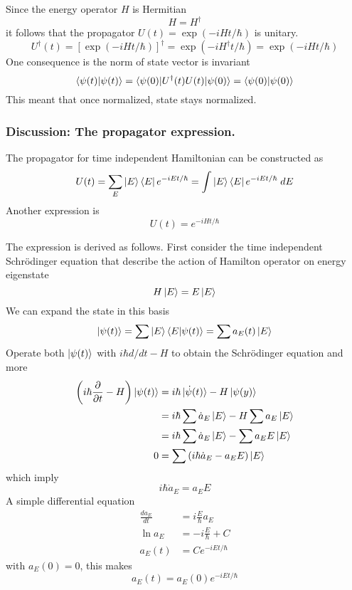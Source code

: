 \documentclass[../../../main.tex]{subfiles}
\begin{document}
Since the energy operator $H$ is Hermitian
\begin{equation*}
    H=H ^\dagger
\end{equation*}
it follows that the propagator $U(t)=\exp(-i Ht/\hbar)$ is unitary.
\begin{equation*}
    U ^\dagger(t)=\left[\exp(-i Ht/\hbar)\right]^\dagger=\exp(-i H ^\dagger t/\hbar)=\exp(-i Ht/\hbar)
\end{equation*} 
One consequence is the norm of state vector is invariant
\begin{equation*}
    \braket{\psi(t)|\psi(t)}=\braket{\psi(0)|U ^\dagger(t)U(t)|\psi(0)}=\braket{\psi(0)|\psi(0)}
\end{equation*}
This meant that once normalized, state stays normalized.

\subsubsection{Discussion: The propagator expression.}
The propagator for time independent Hamiltonian can be constructed as 
\begin{equation*}
    U(t)=\sum_E \ket{E } \bra{E }e^{-iEt/\hbar}=\int \ket{E} \bra{E}e^{-iEt/\hbar}\;dE
\end{equation*}
Another expression is 
\begin{equation*}
    U(t)=e^{-iHt/\hbar}
\end{equation*}

The expression is derived as follows.
First consider the time independent Schrödinger equation that describe the action of Hamilton operator on energy eigenstate
\begin{equation*}
    H \ket{E}=E \ket{E}
\end{equation*}
We can expand the state in this basis 
\begin{equation*}
    \ket{\psi(t)}=\sum \ket{E }\braket{E|\psi(t)}=\sum a_E(t)\ket{E}
\end{equation*}
Operate both $\ket{\psi(t)}$ with $i \hbar d/dt-H$ to obtain the Schrödinger equation and more
\begin{align*}
    \left( i \hbar \frac{\partial }{\partial t }-H  \right) \ket{\psi(t)}&= i \hbar \ket{\dot{\psi}(t)}-H \ket{\psi(y)}\\
    &= i \hbar \sum \dot{a}_E \ket{E }- H\sum a_E \ket{E }\\
    &= i \hbar \sum \dot{a}_E \ket{E }- \sum a_E E\ket{E }\\
    0&= \sum \left( i \hbar \dot{a }_E-a_EE  \right) \ket{E}
\end{align*}
which imply
\begin{equation*}
   i \hbar \dot{a }_E=a_EE 
\end{equation*}
A simple differential equation
\begin{align*}
    \frac{d a_E }{dt }&= i \frac{E }{\hbar }a_E\\
    \ln a_E &= -i \frac{E }{\hbar }+C\\
    a_E(t)&= C e^{-i E t/\hbar}
\end{align*}
with $a_E(0)=0$, this makes 
\begin{equation*}
    a_E(t)= a_E(0)e^{-i E t/\hbar}
\end{equation*}
\end{document}
